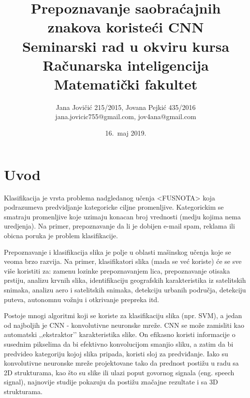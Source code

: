 \documentclass[a4paper]{article}
\begin{document}
\title{Prepoznavanje saobraćajnih znakova koristeći CNN\\ \small{Seminarski rad u okviru kursa\\Računarska inteligencija\\ Matematički fakultet}}

\author{Jana Jovičić 215/2015, Jovana Pejkić 435/2016 \\ jana.jovicic755@gmail.com, jov4ana@gmail.com}

\date{16.~maj 2019.}

\maketitle

\abstract{

}

\newpage

\tableofcontents

\newpage

\section{Uvod}
\label{sec:uvod}

Klasifikacija je vrsta problema nadgledanog učenja <FUSNOTA> koja podrazumeva predvidjanje kategoricke ciljne promenljive. Kategorickim se smatraju promenljive koje uzimaju konacan broj vrednosti (medju kojima nema uredjenja). Na primer, prepoznavanje da li je dobijen e-mail spam, reklama ili obicna poruka je problem klasifikacije.

Prepoznavanje i klasifikacija slika je polje u oblasti mašinskog učenja koje se veoma brzo razvija. Na primer, klasifikatori slika (mada se već koriste) će se sve više koristiti za: zamenu lozinke prepoznavanjem lica, prepoznavanje otisaka prstiju, analizu krvnih slika, identifikaciju geografskih karakteristika iz satelitskih snimaka, analizu aero i satelitskih snimaka, detekciju urbanih područja, detekciju puteva, autonomnu vožnju i otkrivanje prepreka itd.

Postoje mnogi algoritmi koji se koriste za klasifikaciju slika (npr. SVM), a jedan od najboljih je CNN - konvolutivne neuronske mreže. CNN se može zamisliti kao automatski ‚‚ekstraktor’’ karakteristika slike. On efikasno koristi informacije o susednim pikselima da bi efektivno konvolucijom smanjio sliku, a zatim da bi predvideo kategoriju kojoj slika pripada, koristi sloj za predviđanje. Iako su konvolutivne neuronske mreže projektovane tako da prednost postižu u radu sa 2D strukturama, kao što su slike ili ulazi poput govornog signala (eng. speech signal), najnovije studije pokazuju da postižu značajne rezultate i sa 3D strukturama.
\end{document}
